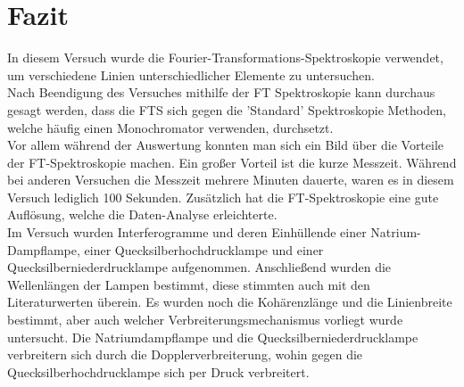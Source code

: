 \chapter{Fazit}
In diesem Versuch wurde die Fourier-Transformations-Spektroskopie verwendet,
um verschiedene Linien unterschiedlicher Elemente zu untersuchen. \\
Nach Beendigung des Versuches mithilfe der FT Spektroskopie kann durchaus 
gesagt werden, dass die FTS sich gegen die 'Standard' Spektroskopie Methoden, 
welche häufig einen Monochromator verwenden, durchsetzt. \\
Vor allem während der Auswertung konnten man sich ein Bild über die Vorteile der
FT-Spektroskopie machen. Ein großer Vorteil ist die kurze Messzeit. 
Während bei anderen Versuchen die Messzeit mehrere Minuten dauerte, waren es  
in diesem Versuch lediglich 100 Sekunden. Zusätzlich hat
die FT-Spektroskopie eine gute Auflösung, welche die Daten-Analyse erleichterte.\\
Im Versuch wurden Interferogramme und deren Einhüllende einer Natrium-Dampflampe, einer 
Quecksilberhochdrucklampe und einer Quecksilberniederdrucklampe aufgenommen. Anschließend
wurden die Wellenlängen der Lampen bestimmt, diese stimmten auch mit den Literaturwerten
überein. Es wurden noch die Kohärenzlänge und die Linienbreite bestimmt, aber 
auch welcher Verbreiterungsmechanismus vorliegt wurde untersucht. Die Natriumdampflampe und 
die Quecksilberniederdrucklampe verbreitern sich durch die Dopplerverbreiterung, wohin
gegen die Quecksilberhochdrucklampe sich per Druck verbreitert. 
